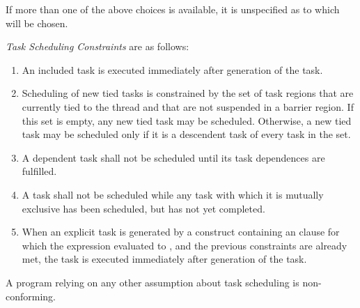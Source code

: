 If more than one of the above choices is available, it is unspecified as 
to which will be chosen.

\emph{Task Scheduling Constraints} are as follows:

\begin{enumerate}
\item An included task is executed immediately after generation of the task.

\item Scheduling of new tied tasks is constrained by the set of task regions 
      that are currently tied to the thread and that are not suspended in a
      barrier region. If this set is empty, any new tied task may be
      scheduled. Otherwise, a new tied task may be scheduled only if it is a 
      descendent task of every task in the set.

\item A dependent task shall not be scheduled until its task dependences are fulfilled.

\item A task shall not be scheduled while any task with which it is
      mutually exclusive has been scheduled, but has not yet completed.

\item When an explicit task is generated by a construct containing an  
      clause for which the expression evaluated to , and the previous 
      constraints are already met, the task is executed immediately after generation 
      of the task.
\end{enumerate}

A program relying on any other assumption about task scheduling is non-conforming.

